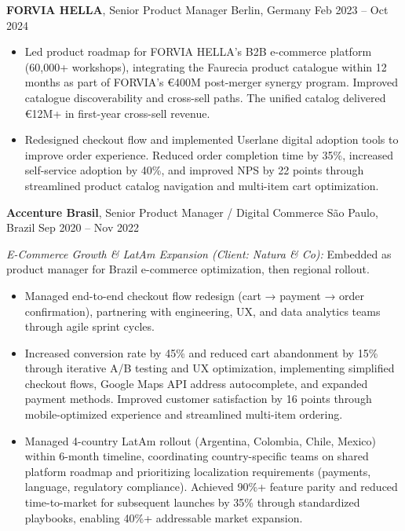 \documentclass[11pt,a4paper]{article}
\begin{document}
\vspace{6pt}

\noindent\textbf{FORVIA HELLA}, Senior Product Manager \hfill Berlin, Germany \textbar{} Feb 2023 -- Oct 2024
\begin{itemize}[leftmargin=*, label=$\bullet$, itemsep=5pt, parsep=0pt]
\item Led product roadmap for FORVIA HELLA's B2B e-commerce platform (60,000+ workshops), integrating the Faurecia product catalogue within 12 months as part of FORVIA's €400M post-merger synergy program. Improved catalogue discoverability and cross-sell paths. The unified catalog delivered €12M+ in first-year cross-sell revenue.

\item Redesigned checkout flow and implemented Userlane digital adoption tools to improve order experience. Reduced order completion time by 35\%, increased self-service adoption by 40\%, and improved NPS by 22 points through streamlined product catalog navigation and multi-item cart optimization.
\end{itemize}

\vspace{6pt}

\noindent\textbf{Accenture Brasil}, Senior Product Manager / Digital Commerce \hfill São Paulo, Brazil \textbar{} Sep 2020 -- Nov 2022

\vspace{6pt}

\noindent\textit{E-Commerce Growth \& LatAm Expansion (Client: Natura \& Co):} Embedded as product manager for Brazil e-commerce optimization, then regional rollout.


\begin{itemize}[leftmargin=*, label=$\bullet$, itemsep=2pt, parsep=0pt]
\item Managed end-to-end checkout flow redesign (cart → payment → order confirmation), partnering with engineering, UX, and data analytics teams through agile sprint cycles.

\item Increased conversion rate by 45\% and reduced cart abandonment by 15\% through iterative A/B testing and UX optimization, implementing simplified checkout flows, Google Maps API address autocomplete, and expanded payment methods. Improved customer satisfaction by 16 points through mobile-optimized experience and streamlined multi-item ordering.

\item Managed 4-country LatAm rollout (Argentina, Colombia, Chile, Mexico) within 6-month timeline, coordinating country-specific teams on shared platform roadmap and prioritizing localization requirements (payments, language, regulatory compliance). Achieved 90\%+ feature parity and reduced time-to-market for subsequent launches by 35\% through standardized playbooks, enabling 40\%+ addressable market expansion.
\end{itemize}
\end{document}

